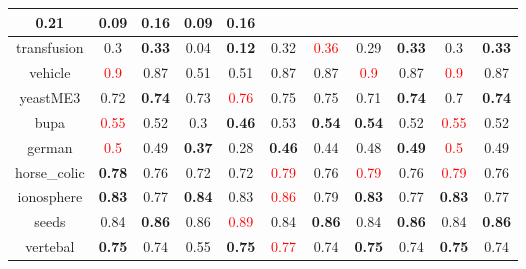 \documentclass{article}%
\begin{document}
\begin{tabular}{c|cccccccccc}
{0.21
}&0.09&\textbf{0.16}&0.09&\textbf{0.16}\\%
\hline%
transfusion&0.3&\textbf{0.33}&0.04&\textbf{0.12}&0.32&\textcolor{red}{ 
0.36
}&0.29&\textbf{0.33}&0.3&\textbf{0.33}\\%
\hline%
vehicle&\textcolor{red}{ 
0.9
}&0.87&0.51&0.51&0.87&0.87&\textcolor{red}{ 
0.9
}&0.87&\textcolor{red}{ 
0.9
}&0.87\\%
\hline%
yeastME3&0.72&\textbf{0.74}&0.73&\textcolor{red}{ 
0.76
}&0.75&0.75&0.71&\textbf{0.74}&0.7&\textbf{0.74}\\%
\hline%
bupa&\textcolor{red}{ 
0.55
}&0.52&0.3&\textbf{0.46}&0.53&\textbf{0.54}&\textbf{0.54}&0.52&\textcolor{red}{ 
0.55
}&0.52\\%
\hline%
german&\textcolor{red}{ 
0.5
}&0.49&\textbf{0.37}&0.28&\textbf{0.46}&0.44&0.48&\textbf{0.49}&\textcolor{red}{ 
0.5
}&0.49\\%
\hline%
horse\_colic&\textbf{0.78}&0.76&0.72&0.72&\textcolor{red}{ 
0.79
}&0.76&\textcolor{red}{ 
0.79
}&0.76&\textcolor{red}{ 
0.79
}&0.76\\%
\hline%
ionosphere&\textbf{0.83}&0.77&\textbf{0.84}&0.83&\textcolor{red}{ 
0.86
}&0.79&\textbf{0.83}&0.77&\textbf{0.83}&0.77\\%
\hline%
seeds&0.84&\textbf{0.86}&0.86&\textcolor{red}{ 
0.89
}&0.84&\textbf{0.86}&0.84&\textbf{0.86}&0.84&\textbf{0.86}\\%
\hline%
vertebal&\textbf{0.75}&0.74&0.55&\textbf{0.75}&\textcolor{red}{ 
0.77
}&0.74&\textbf{0.75}&0.74&\textbf{0.75}&0.74\\%
\hline%
\end{tabular}

%
\end{document}
